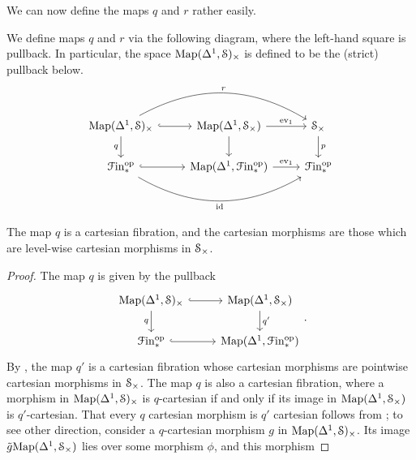 \documentclass[main.tex]{subfiles}
\begin{document}
We can now define the maps $q$ and $r$ rather easily.

\begin{definition}
  We define maps $q$ and $r$ via the following diagram, where the left-hand square is pullback. In particular, the space $\Map(\Delta^{1}, \S)_{\times}$ is defined to be the (strict) pullback below.
  \begin{equation*}
    \begin{tikzcd}
      \Map(\Delta^{1}, \S)_{\times}
      \arrow[r, hook]
      \arrow[rr, bend left, "r"]
      \arrow[d, swap, "q"]
      & \Map(\Delta^{1}, \S_{\times})
      \arrow[r, "\ev_{1}"]
      \arrow[d]
      & \S_{\times}
      \arrow[d, "p"]
      \\
      \Finp\op
      \arrow[r, hook]
      \arrow[rr, bend right, swap, "\id"]
      & \Map(\Delta^{1}, \Finp\op)
      \arrow[r, "\ev_{1}"]
      & \Finp\op
    \end{tikzcd}
  \end{equation*}
\end{definition}

\begin{lemma}
  The map $q$ is a cartesian fibration, and the cartesian morphisms are those which are level-wise cartesian morphisms in $\S_{\times}$.
\end{lemma}
\begin{proof}
  The map $q$ is given by the pullback
  \begin{equation*}
    \begin{tikzcd}
      \Map(\Delta^{1}, \category{S})_{\times}
      \arrow[r, hook]
      \arrow[d, swap, "q"]
      & \Map(\Delta^{1}, \category{S}_{\times})
      \arrow[d, "q'"]
      \\
      \Finp\op
      \arrow[r, hook]
      & \Map(\Delta^{1}, \Finp\op)
    \end{tikzcd}.
  \end{equation*}
  By \cite[Prop.\ 3.1.2.1]{highertopostheory}, the map $q'$ is a cartesian fibration whose cartesian morphisms are pointwise cartesian morphisms in $\S_{\times}$. The map $q$ is also a cartesian fibration, where a morphism in $\Map(\Delta^{1}, \S)_{\times}$ is $q$-cartesian if and only if its image in $\Map(\Delta^{1}, \S_{\times})$ is $q'$-cartesian. That every $q$ cartesian morphism is $q'$ cartesian follows from \cite[Prop\ 2.4.1.3]{highertopostheory}; to see other direction, consider a $q$-cartesian morphism $g$ in $\Map(\Delta^{1}, \S)_{\times}$. Its image $\tilde{g}\Map(\Delta^{1}, \S_{\times})$ lies over some morphism $\phi$, and this morphism 
\end{proof}
\end{document}
